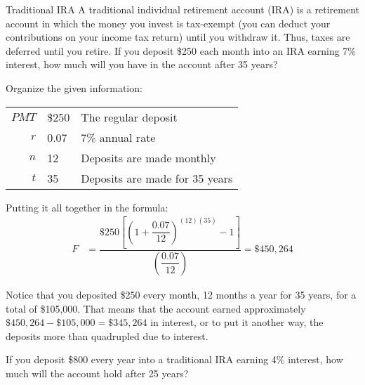 \begin{example}[https://www.youtube.com/watch?v=X1oXL3ZjcCU&list=PLfmpjsIzhztsZtnb7HnXrQ8SLoiOCIcAM&index=26]{Traditional IRA}
A traditional individual retirement account (IRA) is a retirement account in which the money you invest is tax-exempt (you can deduct your contributions on your income tax return) until you withdraw it.  Thus, taxes are deferred until you retire.  If you deposit \$250 each month into an IRA earning 7\% interest, how much will you have in the account after 35 years?

\sol
Organize the given information:
\begin{center}
\begin{tabular}{r l l}
$PMT$ & \$250 & The regular deposit\\
$r$ & 0.07 & 7\% annual rate\\
$n$ & 12 & Deposits are made monthly\\
$t$ & 35 & Deposits are made for 35 years
\end{tabular}
\end{center}

Putting it all together in the formula:
\begin{align*}
F &= \dfrac{\$250\left[\left(1+\dfrac{0.07}{12}\right)^{(12)(35)}-1\right]}{\left(\dfrac{0.07}{12}\right)} = \boxed{\$450,264}
\end{align*}

Notice that you deposited \$250 every month, 12 months a year for 35 years, for a total of \$105,000.  That means that the account earned approximately $\$450,264-\$105,000 = \$345,264$ in interest, or to put it another way, the deposits more than quadrupled due to interest.
\end{example}


\begin{try}
If you deposit \$800 every year into a traditional IRA earning 4\% interest, how much will the account hold after 25 years?
\end{try}

